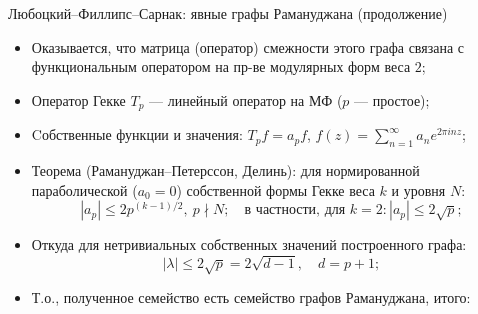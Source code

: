 \documentclass[serif, aspectratio=169]{beamer}
\begin{document}
\begin{frame}{Любоцкий--Филлипс--Сарнак: явные графы Рамануджана (продолжение)}
    \begin{itemize}
        \item Оказывается, что матрица (оператор) смежности этого графа связана с функциональным оператором на пр-ве модулярных форм веса $2$;
        \item Оператор Гекке $T_p$ --- линейный оператор на МФ ($p$ --- простое);
        \item Cобственные функции и значения: $T_p f=a_p f$, $f(z)=\sum_{n=1}^{\infty}a_n e^{2\pi inz}$;
        \item Теорема (Рамануджан--Петерссон, Делинь): для нормированной параболической ($a_0=0$) собственной формы Гекке веса $k$ и уровня $N$:
        \[|a_p|\le 2p^{(k-1)/2},\ p\nmid N;\quad \text{в частности, для } k=2: |a_p|\le 2\sqrt p;\]
        \item Откуда для нетривиальных собственных значений построенного графа:
        \[|\lambda|\le 2\sqrt p=2\sqrt{d-1},\quad d=p+1;\]
        \item Т.о., полученное семейство есть семейство графов Рамануджана, итого:
        \begin{actionenv}
            \begin{center}
            \end{center}
        \end{actionenv}
    \end{itemize}
    \note{
        \begin{itemize}
            \item ---
        \end{itemize}
    }
\end{frame}
\end{document}
